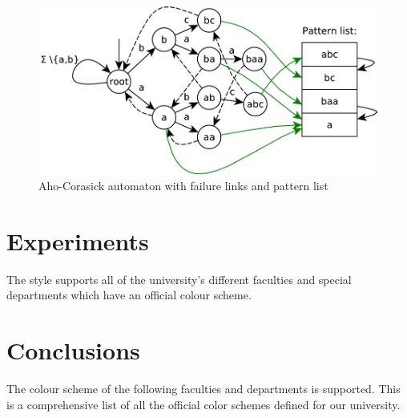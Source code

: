 \documentclass[final]{beamer}
\begin{document}
\begin{poster}
%

\begin{figure}
\label{fig:ac_machine}
\centering
 \includegraphics[width=23cm]{aho_corasick.pdf}
\caption{Aho-Corasick automaton with failure links and pattern list}
\end{figure}


\section{Experiments}

The style supports all of the university's different faculties and special departments which have an official colour scheme.


\section{Conclusions}

The colour scheme of the following faculties and departments is supported. This is a comprehensive list of all the official color schemes defined for our university.


\end{poster}
\end{document}
